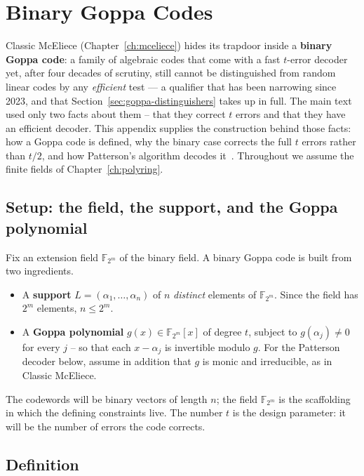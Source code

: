 \chapter{Binary Goppa Codes}
\label{app:goppa}

Classic McEliece (Chapter~\ref{ch:mceliece}) hides its trapdoor inside a \textbf{binary Goppa code}: a family of algebraic codes that come with a fast $t$-error decoder yet, after four decades of scrutiny, still cannot be distinguished from random linear codes by any \emph{efficient} test --- a qualifier that has been narrowing since 2023, and that Section~\ref{sec:goppa-distinguishers} takes up in full. The main text used only two facts about them -- that they correct $t$ errors and that they have an efficient decoder. This appendix supplies the construction behind those facts: how a Goppa code is defined, why the binary case corrects the full $t$ errors rather than $t/2$, and how Patterson's algorithm decodes it~\cite{goppa1970,patterson1975}. Throughout we assume the finite fields of Chapter~\ref{ch:polyring}.

\section{Setup: the field, the support, and the Goppa polynomial}

Fix an extension field $\mathbb{F}_{2^m}$ of the binary field. A binary Goppa code is built from two ingredients.

\begin{itemize}
  \item A \textbf{support} $L = (\alpha_1,\dots,\alpha_n)$ of $n$ \emph{distinct} elements of $\mathbb{F}_{2^m}$. Since the field has $2^m$ elements, $n \le 2^m$.
  \item A \textbf{Goppa polynomial} $g(x) \in \mathbb{F}_{2^m}[x]$ of degree $t$, subject to $g(\alpha_j) \neq 0$ for every $j$ -- so that each $x-\alpha_j$ is invertible modulo $g$. For the Patterson decoder below, assume in addition that $g$ is monic and irreducible, as in Classic McEliece.
\end{itemize}

The codewords will be binary vectors of length $n$; the field $\mathbb{F}_{2^m}$ is the scaffolding in which the defining constraints live. The number $t$ is the design parameter: it will be the number of errors the code corrects.

\section{Definition}

